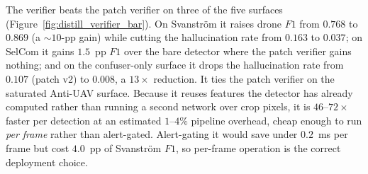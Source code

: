 \documentclass[12pt,a4paper,oneside,openright]{book}
\begin{document}
The verifier beats the patch verifier on three of the five surfaces (Figure~\ref{fig:distill_verifier_bar}). On Svanstr\"om it raises drone $F1$ from $0.768$ to $0.869$ (a $\sim 10$-pp gain) while cutting the hallucination rate from $0.163$ to $0.037$; on SelCom it gains $1.5$~pp $F1$ over the bare detector where the patch verifier gains nothing; and on the confuser-only surface it drops the hallucination rate from $0.107$ (patch v2) to $0.008$, a $13\times$ reduction. It ties the patch verifier on the saturated Anti-UAV surface. Because it reuses features the detector has already computed rather than running a second network over crop pixels, it is $46$--$72\times$ faster per detection at an estimated $1$--$4\%$ pipeline overhead, cheap enough to run \emph{per frame} rather than alert-gated. Alert-gating it would save under $0.2$~ms per frame but cost $4.0$~pp of Svanstr\"om $F1$, so per-frame operation is the correct deployment choice.
\end{document}
